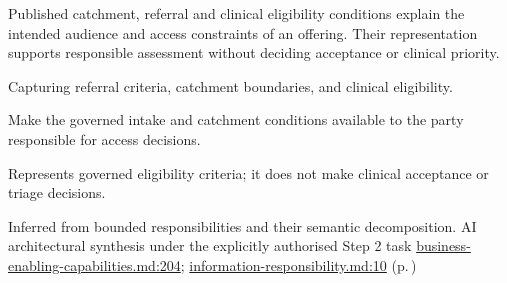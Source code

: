 Published catchment, referral and clinical eligibility conditions explain the intended audience and access constraints of an offering. Their representation supports responsible assessment without deciding acceptance or clinical priority.



Capturing referral criteria, catchment boundaries, and clinical eligibility.



Make the governed intake and catchment conditions available to the party responsible for access decisions.



Represents governed eligibility criteria; it does not make clinical acceptance or triage decisions.


Inferred from bounded responsibilities and their semantic decomposition. AI architectural synthesis under the explicitly authorised Step 2 task \hyperref[evidence:e01893359d483acf]{business-enabling-capabilities.md:204}; \hyperref[evidence:be61392fefb4bb10]{information-responsibility.md:10}
 (p.\,\pageref{cap:bec-healthcare-service-definition})
